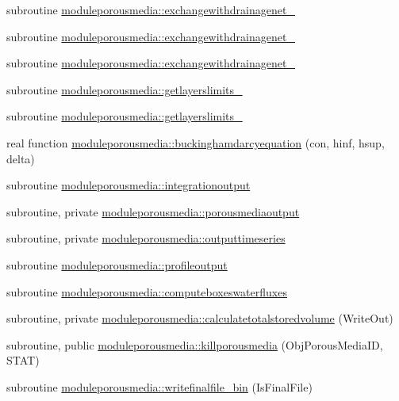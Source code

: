 \begin{DoxyCompactItemize}
\item 
subroutine \mbox{\hyperlink{namespacemoduleporousmedia_a448128120b85135d0a29b8fbdb5a0b1e}{moduleporousmedia\+::exchangewithdrainagenet\+\_}}
\item 
subroutine \mbox{\hyperlink{namespacemoduleporousmedia_a7459ca0efe1499228194caae424c0f28}{moduleporousmedia\+::exchangewithdrainagenet\+\_}}
\item 
subroutine \mbox{\hyperlink{namespacemoduleporousmedia_a3a50b72fe18c884e4924b75c7d58d2c6}{moduleporousmedia\+::exchangewithdrainagenet\+\_}}
\item 
subroutine \mbox{\hyperlink{namespacemoduleporousmedia_ae9d86bed181ca34fa5ffb39235e588fc}{moduleporousmedia\+::getlayerslimits\+\_}}
\item 
subroutine \mbox{\hyperlink{namespacemoduleporousmedia_a68ea6f414786e8b58ce6e1091b663f76}{moduleporousmedia\+::getlayerslimits\+\_}}
\item 
real function \mbox{\hyperlink{namespacemoduleporousmedia_a6c8a46ce1fd00d13bf974507ac525cb8}{moduleporousmedia\+::buckinghamdarcyequation}} (con, hinf, hsup, delta)
\item 
subroutine \mbox{\hyperlink{namespacemoduleporousmedia_a349fd0e731f948138864367a533ec7aa}{moduleporousmedia\+::integrationoutput}}
\item 
subroutine, private \mbox{\hyperlink{namespacemoduleporousmedia_a2bde5212b61a523c797e44d2787e0e7d}{moduleporousmedia\+::porousmediaoutput}}
\item 
subroutine, private \mbox{\hyperlink{namespacemoduleporousmedia_a25ea91b53937b18722679c44410dd4db}{moduleporousmedia\+::outputtimeseries}}
\item 
subroutine \mbox{\hyperlink{namespacemoduleporousmedia_a929b6fbd1b7c5c387333ef5f2d508c18}{moduleporousmedia\+::profileoutput}}
\item 
subroutine \mbox{\hyperlink{namespacemoduleporousmedia_ae3a3e980159413f4ef5a35c8b4763aa6}{moduleporousmedia\+::computeboxeswaterfluxes}}
\item 
subroutine, private \mbox{\hyperlink{namespacemoduleporousmedia_a445b7f7d63644c6c7b90d76b56175868}{moduleporousmedia\+::calculatetotalstoredvolume}} (Write\+Out)
\item 
subroutine, public \mbox{\hyperlink{namespacemoduleporousmedia_a0935fa1b37d6d9dcbd156944ae27cbe3}{moduleporousmedia\+::killporousmedia}} (Obj\+Porous\+Media\+ID, S\+T\+AT)
\item 
subroutine \mbox{\hyperlink{namespacemoduleporousmedia_a98c9f7f64e2362f9f4a6d161dc8a7c99}{moduleporousmedia\+::writefinalfile\+\_\+bin}} (Is\+Final\+File)

\end{DoxyCompactItemize}
